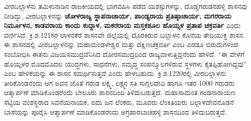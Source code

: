 ವೀರಬಲ್ಲಾಳನು ತಮಿಳುನಾಡಿನ ರಾಜಕೀಯದಲ್ಲಿ ಭಾಗವಹಿಸಿ ಪಡೆದ ಯಶಸ್ಸುಗಳನ್ನು, ದೊಡ್ಡಗರುಡನಹಳ್ಳಿ ಶಾಸನವು ನೀಡಿದ್ದು, ವೀರಬಲ್ಲಾಳನನ್ನು \textbf{ಚೋಳರಾಜ್ಯ ಸ್ಥಾಪನಾಚಾರ್ಯ, ಪಾಂಡ್ಯರಾಯ ಪ್ರತಿಷ್ಠಾಚಾರ್ಯ, ಮಗರರಾಯ ನಿರ್ಮೂಳನ, ಕಾಡವರಾಯ ಕಾಂದು ಕುದ್ದಾಳ, ಮಕರರಾಯ ಮಸ್ತಕಶೂಲ ಹೊಯ್ಸಳ ಪ್ರತಾಪ ಚಕ್ರವರ್ತಿ} ಎಂದು ವರ್ಣಿಸಿದೆ. ಕ್ರಿ.ಶ.1218ರ ಲಾಳನಕೆರೆ ಶಾಸನವೇ ಜಿಲ್ಲೆಯಲ್ಲಿ ದೊರಕಿರುವ ಬಲ್ಲಾಳನ ಕೊನೆಯ ತೇದಿಯುಕ್ತ ಶಾಸನ. ಈ ಶಾಸನದಲ್ಲಿ ವೀರಬಲ್ಲಾಳನನ್ನು ಮಹಾಮಂಡಳೇಶ್ವರ ಮತ್ತು ದಕ್ಷಿಣಚಕ್ರವರ್ತಿ ಎಂಬ ಎರಡೂ ಬಿರುದುಗಳಿಂದ ಸಂಬೋಧಿಸಿ ಈತನು ವಿಜಯಸಮುದ್ರವೆನಿಸಿದ ದೋರಸಮುದ್ರದಿಂದ ರಾಜ್ಯವಾಳುತ್ತಿದ್ದನೆಂದು ಹೇಳಿದೆ. “ಈ ವೇಳೆಗೆ ಹೊಯ್ಸಳರ ಮೊದಮೊದಲ ಯುದ್ಧಗಳು, ಸಾಧನೆಗಳು, ಸಮೃದ್ಧ ಸಂಪನ್ಮೂಲಗಳಿರುವ ಸ್ಥಳಗಳು ಕೈತಪ್ಪಿಹೋಗಿದ್ದವು” ಎಂಬ ಹೇಳಿಕೆಯನ್ನು ಈ ಶಾಸನ ಸಮರ್ಥಿಸುತ್ತದೆ ಎಂದು ಹೇಳಬಹುದು. ಕ್ರಿ.ಶ.1220ರಲ್ಲಿ ವೀರಬಲ್ಲಾಳನು ತೀರಿಕೊಂಡನೆಂದು ಆಗ ಅವನ ಜೊತೆ ಗರುಡ ಲಕ್ಷ್ಮ, ಲಕ್ಷ್ಮನ ಸತಿ ಸುಗ್ಗಲದೇವಿ ಹಾಗೂ ಇತರ 1000 ಗರುಡರು ಆತ್ಮಾರ್ಪಣೆ ಮಾಡಿಕೊಂಡರೆಂದು ಬೇಲೂರು ಶಾಸನದಿಂದಿ ತಿಳಿದುಬರುತ್ತದೆ. ಮಹಾಸಾಮಂತ ಗಂಡನಾರಾಯಣ ಸೆಟ್ಟಿಯ ವಂಶಸ್ಥರಾದ ಸಿವನೆಯನಾಯಕ, ಐದು ಜನ ಲೆಂಕರು, ಮೂವರು ಲೆಂಕಿತಿಯರು ಬಲ್ಲಾಳದೇವನೊಡನೆ ಬಾಸೆಯನ್ನು ಪೂರೈಸಿ ಆತ್ಮಾರ್ಪಣೆ ಮಾಡಿಕೊಂಡರೆಂದು ಅಗ್ರಹಾರಬಾಚಹಳ್ಳಿ ಶಾಸನದಿಂದ ತಿಳಿದುಬರುತ್ತದೆ.


